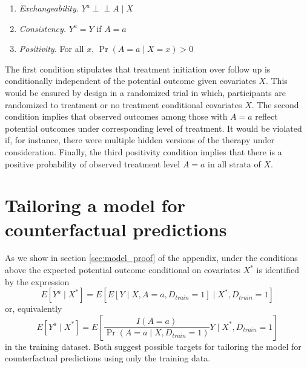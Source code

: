 \begin{enumerate}
    \item \textit{Exchangeability.} $Y^a \perp\!\!\!\perp A \mid X$ 
    \item \textit{Consistency.} $Y^a = Y$ if $A = a$
    \item \textit{Positivity.} For all $x$, $\Pr(A = a \mid X = x) > 0$ 
\end{enumerate}

The first condition stipulates that treatment initiation over follow up is conditionally independent of the potential outcome given covariates $X$. This would be ensured by design in a randomized trial in which, participants are randomized to treatment or no treatment conditional covariates $X$. The second condition implies that observed outcomes among those with $A = a$ reflect potential outcomes under corresponding level of treatment. It would be violated if, for instance, there were multiple hidden versions of the therapy under consideration. Finally, the third positivity condition implies that there is a positive probability of observed treatment level $A = a$ in all strata of $X$.  

\section{Tailoring a model for counterfactual predictions} \label{sec:model}

As we show in section \ref{sec:model_proof} of the appendix, under the conditions above the expected potential outcome conditional on covariates $X^*$ is identified by the expression
\begin{equation}\label{eqn:estimand1}
    E[Y^a \mid X^*] = E[E[Y \mid X, A = a, D_{train} = 1] \mid X^*, D_{train} = 1]
\end{equation}
or, equivalently 
\begin{equation}\label{eqn:estimand2}
    E[Y^a \mid X^*] = E\left[\frac{I(A = a)}{\Pr(A = a \mid X, D_{train} = 1)} Y \mid X^*, D_{train} = 1\right]
\end{equation}
in the training dataset. Both suggest possible targets for tailoring the model for counterfactual predictions using only the training data. 

